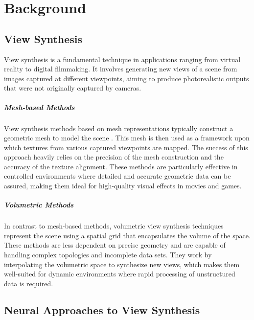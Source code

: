 %
\chapter{Background}
\label{sec:background}

\section{View Synthesis}

View synthesis is a fundamental technique in applications ranging from virtual reality to digital filmmaking.
It involves generating new views of a scene from images captured at different viewpoints, aiming to produce photorealistic outputs that were not originally captured by cameras.

\paragraph{Mesh-based Methods}

View synthesis methods based on mesh representations typically construct a geometric mesh to model the scene \cite{levoy_light_1996,gortler_lumigraph_1996,zitnick_high-quality_2004,debevec_modeling_1996,buehler_unstructured_2001,chen_view_1993}.
This mesh is then used as a framework upon which textures from various captured viewpoints are mapped.
The success of this approach heavily relies on the precision of the mesh construction and the accuracy of the texture alignment.
These methods are particularly effective in controlled environments where detailed and accurate geometric data can be assured, making them ideal for high-quality visual effects in movies and games.

\paragraph{Volumetric Methods}

In contrast to mesh-based methods, volumetric view synthesis techniques represent the scene using a spatial grid that encapsulates the volume of the space.
\cite{seitz_photorealistic_1999,curless_volumetric_1996}
These methods are less dependent on precise geometry and are capable of handling complex topologies and incomplete data sets.
They work by interpolating the volumetric space to synthesize new views, which makes them well-suited for dynamic environments where rapid processing of unstructured data is required.

\section{Neural Approaches to View Synthesis}

